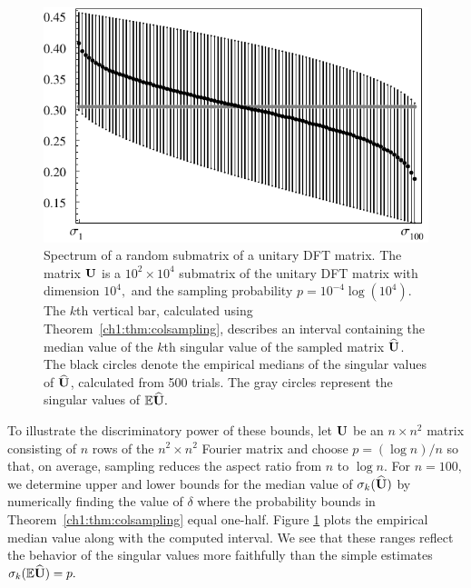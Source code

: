 \begin{figure}[t!]
\centering
\includegraphics{figures/ch1/col_spars_nlogn_100}
\caption[Spectrum of a random submatrix of a unitary DFT matrix.]{%
{\sc Spectrum of a random submatrix of a unitary DFT matrix.}
The matrix $\mathbf{U}$ is a $10^2 \times
10^4$ submatrix of the unitary DFT matrix with dimension $10^4,$ and the
sampling probability $p = 10^{-4} \log(10^4).$ The $k$th vertical bar,
calculated using Theorem~\ref{ch1:thm:colsampling}, describes an interval containing
the median value of the $k$th singular value of the sampled matrix
$\widehat{\mathbf{U}}$. The black circles denote the empirical medians of the
singular values of $\widehat{\mathbf{U}}$, calculated from 500 trials. The gray
circles represent the singular values of $\mathbb{E} \widehat{\mathbf{U}}.$}  
\label{ch1:fig:nlogn}
\end{figure}

To illustrate the discriminatory power of these bounds, let $\mathbf{U}$ be an $n
\times n^2$ matrix consisting of $n$ rows of the $n^2 \times n^2$ Fourier matrix
and choose $p = (\log n)/n$ so that, on average, sampling reduces the aspect
ratio from $n$ to $\log n.$  For $n=100,$ we determine upper and lower bounds
for the median value of $\sigma_k(\widehat{\mathbf{U}})$ by numerically finding the
value of $\delta$ where the probability bounds in Theorem~\ref{ch1:thm:colsampling}
equal one-half. Figure \ref{ch1:fig:nlogn} plots the empirical median value along with
the computed interval. We see that these ranges reflect the behavior of the
singular values more faithfully than the simple estimates $\sigma_k(\mathbb{E}
\widehat{\mathbf{U}}) = p.$


